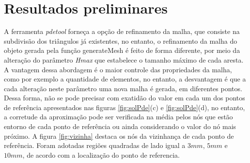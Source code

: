 \documentclass[
    12pt,               %
    openright,          %
    oneside,
    a4paper,            %
    english,            %
    french,             %
    spanish,            %
    brazil              %
    ]{abntex2}
\begin{document}
\section{Resultados preliminares}
A ferramenta \textit{pdetool} forneça a opção de refinamento da malha, que consiste na subdivisão dos triângulos já existentes, no entanto, o refinamento da malha do objeto gerada pela função generateMesh é feito de forma diferente, por meio da alteração do parâmetro \textit{Hmax} que estabelece o tamanho máximo de cada aresta. A vantagem dessa abordagem é o maior controle das propriedades da malha, como por exemplo a quantidade de elementos, no entanto, a desvantagem é que a cada alteração neste parâmetro uma nova malha é gerada, em diferentes pontos. Dessa forma, não se pode precisar com exatidão do valor em cada um dos pontos de referência apresentados nas figuras \ref{fig:solPde}{(c)} e \ref{fig:solPde}{(d)}, no entanto, a corretude da aproximação pode ser verificada na média pelos nós que estão entorno de cada ponto de referência ou ainda considerando o valor do nó mais próximo. A figura \ref{fig:vizinha} destaca os nós da vizinhança de cada ponto de referência. Foram adotadas regiões quadradas de lado igual a $3mm$, $5mm$ e $10mm$, de acordo com a localização do ponto de referencia.

\end{document}
